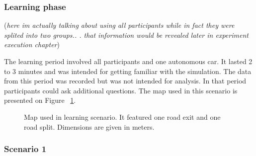 \documentclass[11pt,english]{article}
\begin{document}
\subsubsection*{Learning phase}

(\textit{here im actually talking about using all participants while in fact they were splited into two groups.. . that information would be revealed later in experiment execution chapter})

The learning period involved all participants and one autonomous car. It lasted 2 to 3 minutes and was intended for getting familiar with the simulation. The data from this period was recorded but was not intended for analysis. In that period participants could ask additional questions. The map used in this scenario is presented on Figure ~\ref{fig:map_0_arrows}.


\begin{figure}[] %
\caption{Map used in learning scenario. It featured one road exit and one road split. Dimensions are given in meters.}
\label{fig:map_0_arrows}
\end{figure}


\subsubsection*{Scenario 1}
\end{document}
